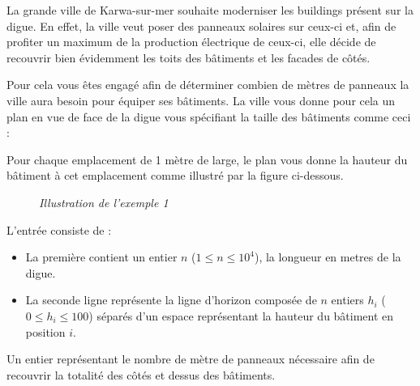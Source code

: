 \problemname{\problemyamlname}

La grande ville de Karwa-sur-mer souhaite moderniser les buildings présent sur la digue.
En effet, la ville veut poser des panneaux solaires sur ceux-ci et, afin de profiter un maximum de la production électrique de ceux-ci, elle décide de recouvrir bien évidemment les toits des bâtiments et les facades de côtés.

Pour cela vous êtes engagé afin de déterminer combien de mètres de panneaux la ville aura besoin pour équiper ses bâtiments.
La ville vous donne pour cela un plan en vue de face de la digue vous spécifiant la taille des bâtiments comme ceci :

Pour chaque emplacement de 1 mètre de large, le plan vous donne la hauteur du bâtiment à cet emplacement comme illustré par la figure ci-dessous.

\begin{figure}[h]
\centering
{}
\newline
\textit{Illustration de l'exemple 1}
\end{figure}

\begin{Input}
	L'entrée consiste de :
	\begin{itemize}
		\item La première contient un entier $n$ ($1 \le n \le 10^4$), la longueur en metres de la digue.
		\item La seconde ligne représente la ligne d'horizon composée de $n$ entiers $h_i$ ($0 \le h_i \le 100$) séparés d'un espace représentant la hauteur du bâtiment en position $i$.
	\end{itemize}
\end{Input}

\begin{Output}
	Un entier représentant le nombre de mètre de panneaux nécessaire afin de recouvrir la totalité des côtés et dessus des bâtiments.
\end{Output}
